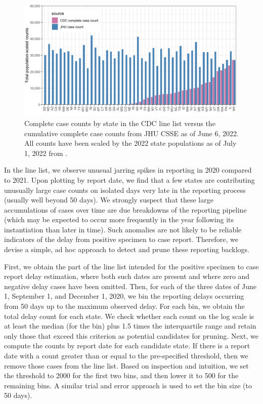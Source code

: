 \documentclass{article}
\begin{document}
\begin{figure}[!tb]
\centering
    \includegraphics[width=0.99\textwidth]{prop_cc_cdc_vs_jhu.pdf} 
    \caption{Complete case counts by state in the CDC line list versus the 
    cumulative complete case counts from JHU CSSE as of June 6, 2022.
     All counts have been scaled by the 2022 state populations as of
     July 1, 2022 from \citet{uscensus2022annual}.}
    \label{fig:prop_cc_cdc_vs_jhu}
\end{figure}

In the line list, we observe unusual jarring spikes in reporting in 2020 compared
to 2021. Upon plotting by report date, we find that a few states are
contributing unusually large case counts on isolated days very late in the
reporting process (usually well beyond 50 days). We strongly suspect that
these large accumulations of cases over time are due breakdowns of the reporting
pipeline (which may be expected to occur more frequently in the year following
its instantiation than later in time). Such anomalies are not likely to be reliable
indicators of the delay from positive specimen to case report. Therefore, we devise
a simple, ad hoc approach to detect and prune these reporting backlogs.

First, we obtain the part of the line list intended for the positive specimen to case
 report delay estimation, where both such dates are present and where zero and
  negative delay cases have been omitted. 
Then, for each of the three dates of June 1, September 1, and
December 1, 2020, we bin the reporting delays occurring
from 50 days up to the maximum observed delay. For each bin, we obtain
the total delay count for each state. We check whether each count on the
log scale is at least the median (for the bin) plus 1.5 times the
interquartile range and retain only those that exceed this criterion as potential
candidates for pruning. Next, we compute the counts by report date for each
candidate state. If there is a report date with a count greater than or equal to
the pre-specified threshold, then we remove those cases from the line list.
Based on inspection and intuition, we set the threshold to 2000 for the
first two bins, and then lower it to 500 for the remaining bins. 
A similar trial and error approach is used to set the bin size (to 50 days). %
\end{document}

